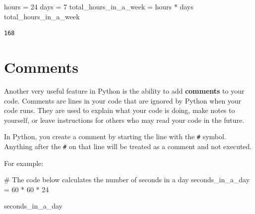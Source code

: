 \documentclass[
  letterpaper,
  DIV=11,
  numbers=noendperiod]{scrreprt}
\newenvironment{Shaded}{\begin{snugshade}}{\end{snugshade}}
\newcommand{\CommentTok}[1]{\textcolor[rgb]{0.37,0.37,0.37}{#1}}
\newcommand{\DecValTok}[1]{\textcolor[rgb]{0.68,0.00,0.00}{#1}}
\newcommand{\NormalTok}[1]{\textcolor[rgb]{0.00,0.23,0.31}{#1}}
\newcommand{\OperatorTok}[1]{\textcolor[rgb]{0.37,0.37,0.37}{#1}}
\begin{document}
\begin{tcolorbox}[enhanced jigsaw, colframe=quarto-callout-note-color-frame, toprule=.15mm, left=2mm, breakable, colbacktitle=quarto-callout-note-color!10!white, arc=.35mm, opacityback=0, colback=white, leftrule=.75mm, title=\textcolor{quarto-callout-note-color}{\faInfo}\hspace{0.5em}{Solution}, bottomrule=.15mm, bottomtitle=1mm, toptitle=1mm, titlerule=0mm, rightrule=.15mm, opacitybacktitle=0.6, coltitle=black]

\begin{Shaded}
\begin{Highlighting}[]
\NormalTok{hours }\OperatorTok{=} \DecValTok{24}
\NormalTok{days }\OperatorTok{=} \DecValTok{7}
\NormalTok{total\_hours\_in\_a\_week }\OperatorTok{=}\NormalTok{ hours }\OperatorTok{*}\NormalTok{ days}
\NormalTok{total\_hours\_in\_a\_week}
\end{Highlighting}
\end{Shaded}

\begin{verbatim}
168
\end{verbatim}

\end{tcolorbox}

\section{Comments}\label{comments}

Another very useful feature in Python is the ability to add
\textbf{comments} to your code. Comments are lines in your code that are
ignored by Python when your code runs. They are used to explain what
your code is doing, make notes to yourself, or leave instructions for
others who may read your code in the future.

In Python, you create a comment by starting the line with the
\texttt{\#} symbol. Anything after the \texttt{\#} on that line will be
treated as a comment and not executed.

For example:

\begin{Shaded}
\begin{Highlighting}[]
\CommentTok{\# The code below calculates the number of seconds in a day}
\NormalTok{seconds\_in\_a\_day }\OperatorTok{=} \DecValTok{60} \OperatorTok{*} \DecValTok{60} \OperatorTok{*} \DecValTok{24}

\NormalTok{seconds\_in\_a\_day}
\end{Highlighting}
\end{Shaded}
\end{document}
